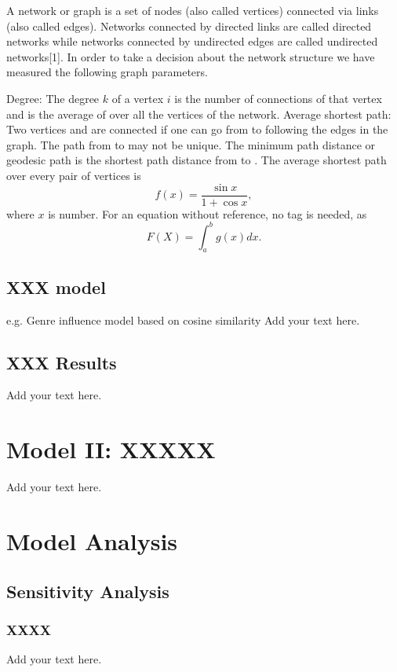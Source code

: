 \documentclass[12pt]{article}
\begin{document}
A network or graph is a set of nodes (also called vertices) connected via links (also called edges). Networks connected by directed links are called directed networks while networks connected by undirected edges are called undirected networks[1]. In order to take a decision about the network structure we have measured the following graph parameters.

Degree: The degree $k$ of a vertex $i$  is the number of connections of that vertex and   is the average of   over all the vertices of the network.
Average shortest path: Two vertices   and   are connected if one can go from  to following the edges in the graph. The path from   to   may not be unique. The minimum path distance or geodesic path   is the shortest path distance from   to  . The average shortest path over every pair of vertices is
\begin{equation}
    f(x)=\dfrac{\sin x}{1+\cos x},
\end{equation}
where $x$ is number. For an  equation without reference, no tag is needed, as 
$$F(X)=\int_a^b g(x) dx.$$

\subsection{	XXX model }

e.g. Genre influence model based on cosine similarity Add your text here.

\subsection{XXX Results} 
Add your text here.
\section{Model II: XXXXX}

Add your text here.

\section{Model Analysis}
\subsection{Sensitivity Analysis}
\subsubsection{XXXX}

Add your text here.
\end{document}
